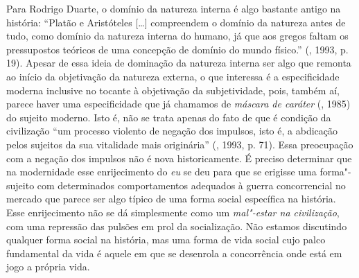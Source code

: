 Para Rodrigo Duarte, o domínio da natureza interna é algo bastante
antigo na história: ``Platão e Aristóteles [\ldots{}] compreendem o
domínio da natureza antes de tudo, como domínio da natureza interna do
humano, já que aos gregos faltam os pressupostos teóricos de uma
concepção de domínio do mundo físico.'' (, 1993, p. 19). Apesar de
essa ideia de dominação da natureza interna ser algo que remonta ao
início da objetivação da natureza externa, o que interessa é
a especificidade moderna inclusive no tocante à
objetivação da subjetividade, pois, também aí, parece haver uma
especificidade que já chamamos de \emph{máscara de caráter} (, 1985)
do sujeito moderno. Isto é, não se trata apenas do fato de que é
condição da civilização ``um processo violento de negação dos impulsos,
isto é, a abdicação pelos sujeitos da sua vitalidade mais originária''
(, 1993, p. 71). Essa preocupação com a negação dos impulsos não
é nova historicamente. É preciso determinar que na modernidade esse
enrijecimento do \emph{eu} se deu para que se erigisse uma forma"-sujeito
com determinados comportamentos adequados à guerra concorrencial no
mercado que parece ser algo típico de uma forma social específica na
história. Esse enrijecimento não se dá simplesmente como um
\emph{mal"-estar na civilização}, com uma repressão das pulsões em prol
da socialização. Não estamos discutindo qualquer forma social na
história, mas uma forma de vida social cujo palco fundamental da vida é
aquele em que se desenrola a concorrência onde está em jogo a própria
vida.

